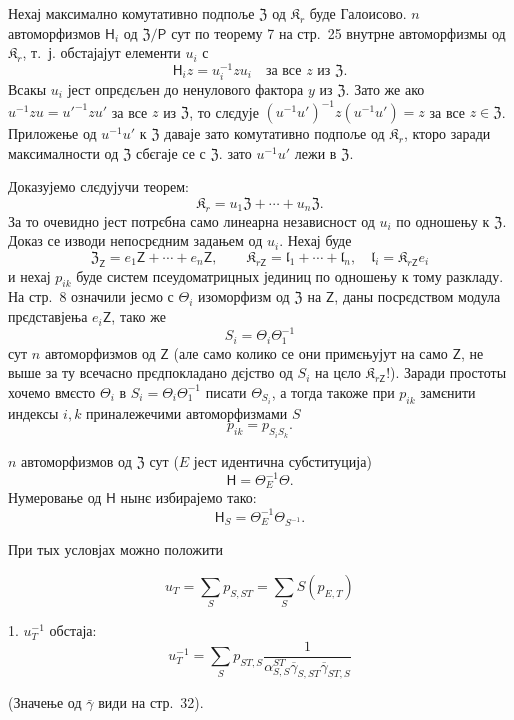 \documentclass[11pt]{article}
\begin{document}
Нехај максимално комутативно подпоље \(\mathfrak Z\) од \(\mathfrak K_r\) буде Галоисово. \(n\) автоморфизмов \(\mathsf{H}_i\) од \(\mathfrak Z/\mathsf P\) сут по теорему 7 на стр.~25 внутрне автоморфизмы од \(\mathfrak K_r\), т.~ј. обстајајут елементи \(u_i\) с
\[
\mathsf{H}_i z=u_i^{-1}zu_i\quad\text{за все }z\text{ из }\mathfrak Z.
\]
Всакы \(u_i\) јест опрєдєљен до ненулового фактора \(y\) из \(\mathfrak Z\). Зато же ако \(u^{-1}zu=u'^{-1}zu'\) за все \(z\) из \(\mathfrak Z\), то слєдује \((u^{-1}u')^{-1}z(u^{-1}u')=z\) за все \(z\in\mathfrak Z\). Приложење од \(u^{-1}u'\) к \(\mathfrak Z\) даваје зато комутативно подпоље од \(\mathfrak K_r\), кторо заради максималности од \(\mathfrak Z\) сбєгаје се с \(\mathfrak Z\). зато \(u^{-1}u'\) лежи в \(\mathfrak Z\).

Доказујемо слєдујучи теорем:
\[
\mathfrak K_r=u_1\mathfrak Z+\cdots+u_n\mathfrak Z.
\]
За то очевидно јест потрєбна само линеарна независност од \(u_i\) по одношењу к \(\mathfrak Z\). Доказ се изводи непосрєдним задањем од \(u_i\). Нехај буде
\[
\mathfrak Z_{\mathsf{Z}}=e_1\mathsf{Z}+\cdots+e_n\mathsf{Z},\qquad
\mathfrak K_{r\mathsf{Z}}=\mathfrak l_1+\cdots+\mathfrak l_n,\quad
\mathfrak l_i=\mathfrak K_{r\mathsf{Z}}e_i
\]
и нехај \(p_{ik}\) буде систем псеудоматрицных јединиц по одношењу к тому разкладу. На стр.~8 означили јесмо с \(\Theta_i\) изоморфизм од \(\mathfrak Z\) на \(\mathsf{Z}\), даны посрєдством модула прєдставјења \(e_i\mathsf{Z}\), тако же
\[
S_i=\Theta_i\Theta_1^{-1}
\]
сут \(n\) автоморфизмов од \(\mathsf{Z}\) (але само колико се они примєњујут на само \(\mathsf{Z}\), не выше за ту всечасно прєдпокладано дєјство од \(S_i\) на цєло \(\mathfrak K_{r\mathsf{Z}}\)!). Заради простоты хочемо вмєсто \(\Theta_i\) в \(S_i=\Theta_i\Theta_1^{-1}\) писати \(\Theta_{S_i}\), а тогда такоже при \(p_{ik}\) замєнити индексы \(i,k\) приналежечими автоморфизмами \(S\)
\[
p_{ik}=p_{S_iS_k}.
\]

\(n\) автоморфизмов од \(\mathfrak Z\) сут (\(E\) јест идентична субституција)
\[
\mathsf{H}=\Theta_E^{-1}\Theta.
\]
Нумеровање од \(\mathsf{H}\) нынє избирајемо тако:
\[
\mathsf{H}_S=\Theta_E^{-1}\Theta_{S^{-1}}.
\]

При тых условјах можно положити

\[
u_T=\sum_S p_{S,ST}=\sum_S S(p_{E,T})
\]



1. \(u_T^{-1}\) обстаја:
\[
u_T^{-1}=\sum_S p_{ST,S}
\frac{1}{\alpha_{S,S}^{ST}\overline{\gamma}_{S,ST}\overline{\gamma}_{ST,S}}
\]

(Значење од \(\bar{\gamma}\) види на стр.~32).
\end{document}
